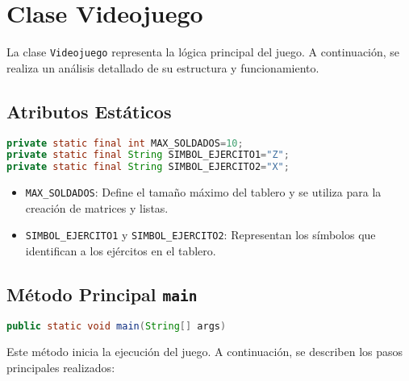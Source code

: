 
\section{Clase Videojuego}

La clase \texttt{Videojuego} representa la lógica principal del juego. A continuación, se realiza un análisis detallado de su estructura y funcionamiento.

\subsection{Atributos Estáticos}

\begin{lstlisting}[language=Java]
private static final int MAX_SOLDADOS=10;
private static final String SIMBOL_EJERCITO1="Z";
private static final String SIMBOL_EJERCITO2="X";
\end{lstlisting}

\begin{itemize}
  \item \texttt{MAX_SOLDADOS}: Define el tamaño máximo del tablero y se utiliza para la creación de matrices y listas.
  \item \texttt{SIMBOL_EJERCITO1} y \texttt{SIMBOL_EJERCITO2}: Representan los símbolos que identifican a los ejércitos en el tablero.
\end{itemize}

\subsection{Método Principal \texttt{main}}

\begin{lstlisting}[language=Java]
public static void main(String[] args)
\end{lstlisting}

Este método inicia la ejecución del juego. A continuación, se describen los pasos principales realizados:

